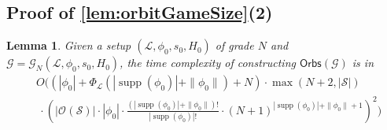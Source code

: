 \documentclass[10pt,a4paper]{article}
\newtheorem{lemma}[theorem]{Lemma}
\theoremstyle{definition}
\theoremstyle{remark}
\DeclareMathOperator{\supp}{supp}
\newcommand\Gcal{\mathcal{G}}
\newcommand\Lcal{\mathcal{L}}
\newcommand\Scal{\mathcal{S}}
\newcommand\orb[1][]{\mathcal{O}_{#1}}
\renewcommand\S{N}
\newcommand\gorb[0]{{\mathsf{Orbs}}}
\begin{document}
\subsection*{Proof of \cref{lem:orbitGameSize}(2)}\label{app:complexityboundedgame}
\begin{lemma}
  Given a setup $(\Lcal,\phi_0,s_0,H_0)$ of grade $N$ and $\Gcal=\Gcal_N(\Lcal, \phi_0, s_0, H_0)$,
 the time complexity of constructing $\gorb(\Gcal)$ is in
 	\begin{align*}
	&O(
 	(|\phi_0| + \Phi_\Lcal(|\supp(\phi_0)| + \|\phi_0\|) + \S)
 	\cdot
 	\max(N + 2, |\Scal|
 	) \\&\ \cdot 
 	(|\orb(\Scal)| \cdot|\phi_0|\cdot \frac{(|\supp(\phi_0)|+\|\phi_0\|)!}{|\supp(\phi_0)|!}\cdot (\S + 1)^{|\supp(\phi_0)| + \|\phi_0\| + 1})
 	^2)
 \end{align*}
  \end{lemma}
\end{document}
